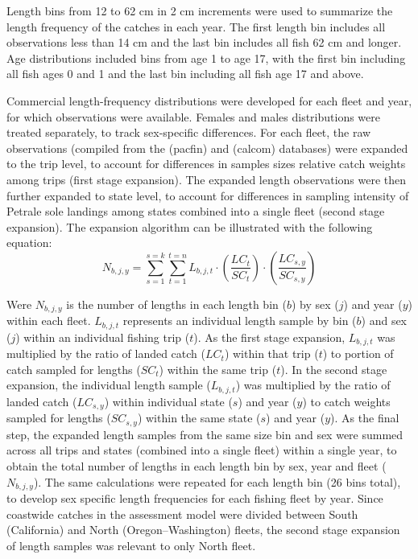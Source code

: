 \documentclass[
]{scrartcl}
\begin{document}
Length bins from 12 to 62 cm in 2 cm increments were used to summarize
the length frequency of the catches in each year. The first length bin
includes all observations less than 14 cm and the last bin includes all
fish 62 cm and longer. Age distributions included bins from age 1 to age
17, with the first bin including all fish ages 0 and 1 and the last bin
including all fish age 17 and above.

Commercial length-frequency distributions were developed for each fleet
and year, for which observations were available. Females and males
distributions were treated separately, to track sex-specific
differences. For each fleet, the raw observations (compiled from the
(\textsf{pacfin}) and (\textsf{calcom}) databases) were expanded to the trip level, to
account for differences in samples sizes relative catch weights among
trips (first stage expansion). The expanded length observations were
then further expanded to state level, to account for differences in
sampling intensity of Petrale sole landings among states combined into a
single fleet (second stage expansion). The expansion algorithm can be
illustrated with the following equation:
%
%
\[ 
N_{b,j,y} = \sum_{s=1}^{s=k}\sum_{t=1}^{t=n}L_{b,j,t} \cdot
\left(\frac{LC_t}{SC_t}\right) \cdot \left(\frac{LC_{s,y}}{SC_{s,y}}\right) 
\]


Were \(N_{b,j,y}\) is the number of lengths in each length bin (\(b\))
by sex (\(j\)) and year (\(y\)) within each fleet. \(L_{b,j,t}\)
represents an individual length sample by bin (\(b\)) and sex (\(j\))
within an individual fishing trip (\(t\)). As the first stage expansion,
\(L_{b,j,t}\) was multiplied by the ratio of landed catch (\(LC_t\))
within that trip (\(t\)) to portion of catch sampled for lengths
(\(SC_t\)) within the same trip (\(t\)). In the second stage expansion,
the individual length sample (\(L_{b,j,t}\)) was multiplied by the ratio
of landed catch (\(LC_{s,y}\)) within individual state (\(s\)) and year
(\(y\)) to catch weights sampled for lengths (\(SC_{s,y}\)) within the
same state (\(s\)) and year (\(y\)). As the final step, the expanded
length samples from the same size bin and sex were summed across all
trips and states (combined into a single fleet) within a single year, to
obtain the total number of lengths in each length bin by sex, year and
fleet (\(N_{b,j,y}\)). The same calculations were repeated for each
length bin (26 bins total), to develop sex specific length frequencies
for each fishing fleet by year. Since coastwide catches in the
assessment model were divided between South (California) and North
(Oregon--Washington) fleets, the second stage expansion of length samples
was relevant to only North fleet.
\end{document}
